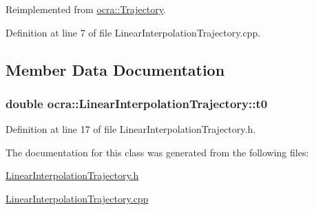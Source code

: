 Reimplemented from \hyperlink{classocra_1_1Trajectory_a2102a829e6dad497f7c773c346d499b7}{ocra\+::\+Trajectory}.



Definition at line 7 of file Linear\+Interpolation\+Trajectory.\+cpp.



\subsection{Member Data Documentation}
\subsubsection[{\texorpdfstring{t0}{t0}}]{\setlength{\rightskip}{0pt plus 5cm}double ocra\+::\+Linear\+Interpolation\+Trajectory\+::t0\hspace{0.3cm}{\ttfamily [protected]}}\hypertarget{classocra_1_1LinearInterpolationTrajectory_af29697e472859fbf1cbbf4ad30068222}{}\label{classocra_1_1LinearInterpolationTrajectory_af29697e472859fbf1cbbf4ad30068222}


Definition at line 17 of file Linear\+Interpolation\+Trajectory.\+h.



The documentation for this class was generated from the following files\+:\begin{DoxyCompactItemize}
\item 
\hyperlink{LinearInterpolationTrajectory_8h}{Linear\+Interpolation\+Trajectory.\+h}\item 
\hyperlink{LinearInterpolationTrajectory_8cpp}{Linear\+Interpolation\+Trajectory.\+cpp}\end{DoxyCompactItemize}
